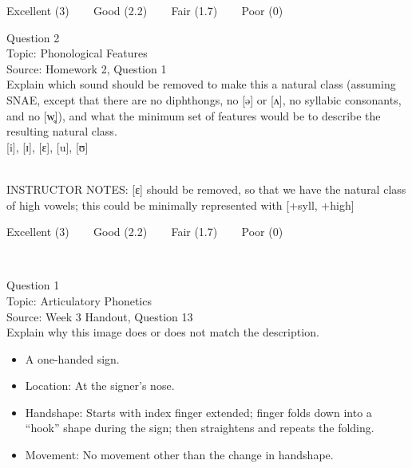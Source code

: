 \documentclass[12pt]{article}
\begin{document}
\vfill
Excellent (3) ~~~ Good (2.2) ~~~ Fair (1.7) ~~~ Poor (0)
\newpage

{\large Question 2}\\

Topic: Phonological Features\\
Source: Homework 2, Question 1\\

Explain which sound should be removed to make this a natural class (assuming SNAE, except that there are no diphthongs, no [ə] or [ʌ], no syllabic consonants, and no [w̥]), and what the minimum set of features would be to describe the resulting natural class.\\

{[i]}, {[ɪ]}, {[ɛ]}, {[u]}, {[ʊ]}


~\\
INSTRUCTOR NOTES: [ɛ] should be removed, so that we have the natural class of high vowels; this could be minimally represented with [+syll, +high]


\vfill
Excellent (3) ~~~ Good (2.2) ~~~ Fair (1.7) ~~~ Poor (0)
\newpage

\begin{center}
\textbf{{\color{red}{\HUGE END OF EXAM}}}\\

\end{center}
\newpage

\begin{center}
\textbf{{\color{blue}{\HUGE START OF EXAM\\}}}

\textbf{{\color{blue}{\HUGE Student ID: 79667\\}}}

\textbf{{\color{blue}{\HUGE 4:10\\}}}

\end{center}
\newpage

{\large Question 1}\\

Topic: Articulatory Phonetics\\
Source: Week 3 Handout, Question 13\\

Explain why this image does or does not match the description.\\

\begin{itemize} \item A one-handed sign. \item Location: At the signer’s nose. \item Handshape: Starts with index finger extended; finger folds down into a “hook” shape during the sign; then straightens and repeats the folding. \item Movement: No movement other than the change in handshape. \end{itemize}
\end{document}
